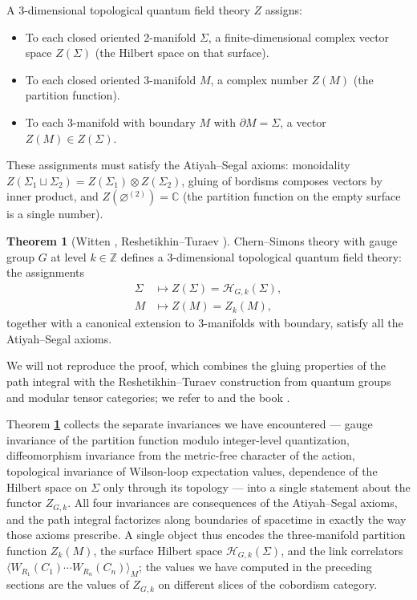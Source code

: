 \documentclass[11pt]{article}
\newcommand{\C}{\mathbb{C}}
\newcommand{\Z}{\mathbb{Z}}
\theoremstyle{definition}
\newtheorem{theorem}[equation]{Theorem}
\numberwithin{theorem}{section}
\numberwithin{equation}{section}
\let\del\partial
\let\emptyset\varnothing
\begin{document}
\begin{setup}\label{setup:TQFT}
A 3-dimensional topological quantum field theory $Z$ assigns:
\begin{itemize}
\item To each closed oriented 2-manifold $\Sigma$, a finite-dimensional complex vector space $Z(\Sigma)$ (the Hilbert space on that surface).
\item To each closed oriented 3-manifold $M$, a complex number $Z(M)$ (the partition function).
\item To each 3-manifold with boundary $M$ with $\del M = \Sigma$, a vector $Z(M)\in Z(\Sigma)$.
\end{itemize}
These assignments must satisfy the Atiyah--Segal axioms: monoidality $Z(\Sigma_1\sqcup \Sigma_2) = Z(\Sigma_1)\otimes Z(\Sigma_2)$, gluing of bordisms composes vectors by inner product, and $Z(\emptyset^{(2)}) = \C$ (the partition function on the empty surface is a single number).
\end{setup}

\begin{theorem}[Witten \cite{Witten1989Jones}, Reshetikhin--Turaev \cite{ReshetikhinTuraev1991}]\label{thm:CS-is-TQFT}
Chern--Simons theory with gauge group $G$ at level $k\in \Z$ defines a 3-dimensional topological quantum field theory: the assignments
\begin{align*}
\Sigma &\longmapsto Z(\Sigma) = \mathcal{H}_{G,k}(\Sigma), \\
M &\longmapsto Z(M) = Z_k(M),
\end{align*}
together with a canonical extension to 3-manifolds with boundary, satisfy all the Atiyah--Segal axioms.
\end{theorem}

\noindent We will not reproduce the proof, which combines the gluing properties of the path integral with the Reshetikhin--Turaev construction from quantum groups and modular tensor categories; we refer to \cite{ReshetikhinTuraev1991} and the book \cite{Turaev2016QuantumInvariants}.

\medskip

\noindent Theorem \textbf{\ref{thm:CS-is-TQFT}} collects the separate invariances we have encountered --- gauge invariance of the partition function modulo integer-level quantization, diffeomorphism invariance from the metric-free character of the action, topological invariance of Wilson-loop expectation values, dependence of the Hilbert space on $\Sigma$ only through its topology --- into a single statement about the functor $Z_{G,k}$. All four invariances are consequences of the Atiyah--Segal axioms, and the path integral factorizes along boundaries of spacetime in exactly the way those axioms prescribe. A single object thus encodes the three-manifold partition function $Z_k(M)$, the surface Hilbert space $\mathcal{H}_{G,k}(\Sigma)$, and the link correlators $\langle W_{R_1}(C_1)\cdots W_{R_n}(C_n)\rangle_M$; the values we have computed in the preceding sections are the values of $Z_{G,k}$ on different slices of the cobordism category.
\end{document}
